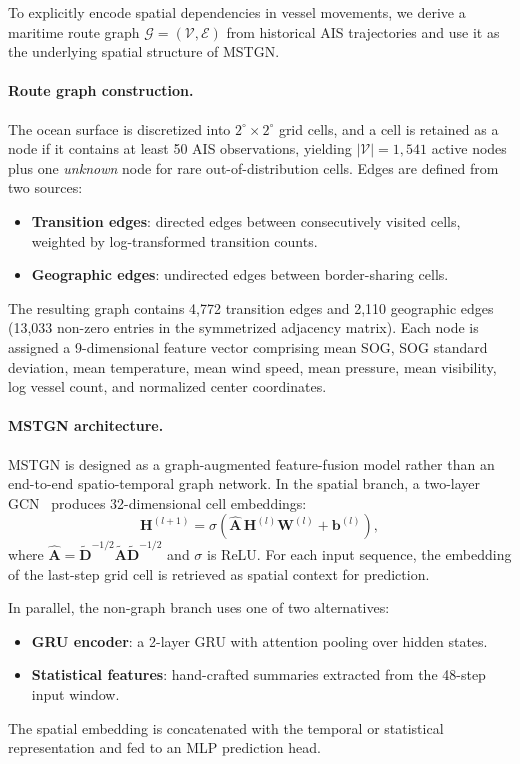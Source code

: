 \documentclass[sigconf,anonymous]{acmart}%
\begin{document}
To explicitly encode spatial dependencies in vessel movements, we derive a maritime route graph $\mathcal{G} = (\mathcal{V}, \mathcal{E})$ from historical AIS trajectories and use it as the underlying spatial structure of MSTGN.

\paragraph{Route graph construction.}
The ocean surface is discretized into $2^\circ \times 2^\circ$ grid cells, and a cell is retained as a node if it contains at least 50 AIS observations, yielding $|\mathcal{V}| = 1{,}541$ active nodes plus one \textit{unknown} node for rare out-of-distribution cells. Edges are defined from two sources:
\begin{itemize}
    \item \textbf{Transition edges}: directed edges between consecutively visited cells, weighted by log-transformed transition counts.
    \item \textbf{Geographic edges}: undirected edges between border-sharing cells.
\end{itemize}
The resulting graph contains 4{,}772 transition edges and 2{,}110 geographic edges (13{,}033 non-zero entries in the symmetrized adjacency matrix). Each node is assigned a 9-dimensional feature vector comprising mean SOG, SOG standard deviation, mean temperature, mean wind speed, mean pressure, mean visibility, log vessel count, and normalized center coordinates.
\paragraph{MSTGN architecture.}
MSTGN is designed as a graph-augmented feature-fusion model rather than an end-to-end spatio-temporal graph network. In the spatial branch, a two-layer GCN~\cite{kipf2017gcn} produces 32-dimensional cell embeddings:
\begin{equation}
    \mathbf{H}^{(l+1)} = \sigma\!\left(\hat{\mathbf{A}} \, \mathbf{H}^{(l)} \mathbf{W}^{(l)} + \mathbf{b}^{(l)}\right),
\end{equation}
where $\hat{\mathbf{A}} = \tilde{\mathbf{D}}^{-1/2}\tilde{\mathbf{A}}\tilde{\mathbf{D}}^{-1/2}$ and $\sigma$ is ReLU. For each input sequence, the embedding of the last-step grid cell is retrieved as spatial context for prediction.

In parallel, the non-graph branch uses one of two alternatives:
\begin{itemize}
    \item \textbf{GRU encoder}: a 2-layer GRU with attention pooling over hidden states.
    \item \textbf{Statistical features}: hand-crafted summaries extracted from the 48-step input window.
\end{itemize}
The spatial embedding is concatenated with the temporal or statistical representation and fed to an MLP prediction head.
\end{document}
